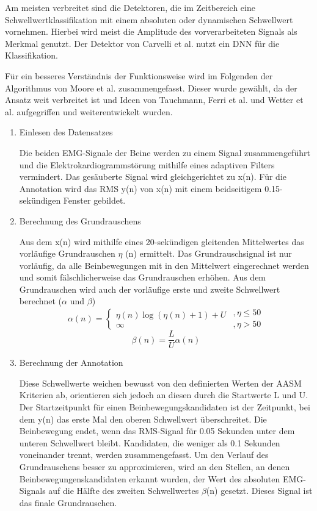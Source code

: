Am meisten verbreitet sind die Detektoren, die im Zeitbereich eine Schwellwertklassifikation mit einem absoluten \cite{wetter,ferri,Huang,stefani,tauchmann} oder dynamischen \cite{alvarez,Moore} Schwellwert vornehmen. Hierbei wird meist die Amplitude des vorverarbeiteten Signals als Merkmal genutzt. Der Detektor von Carvelli et al. nutzt ein \gls{DNN} für die Klassifikation.

Für ein besseres Verständnis der Funktionsweise wird im Folgenden der Algorithmus von Moore et al. zusammengefasst. Dieser wurde gewählt, da der Ansatz weit verbreitet ist und Ideen von Tauchmann, Ferri et al. und Wetter et al. aufgegriffen und weiterentwickelt wurden. 


\begin{enumerate}
	\item Einlesen des Datensatzes
	
	Die beiden EMG-Signale der Beine werden zu einem Signal zusammengeführt und die Elektrokardiogrammstörung mithilfe eines adaptiven Filters vermindert.
    Das gesäuberte Signal wird gleichgerichtet zu x(n).
    Für die Annotation wird das RMS y(n) von x(n) mit einem beidseitigem 0.15-sekündigen Fenster gebildet. 

	\item Berechnung des Grundrauschens
	
	Aus dem x(n) wird mithilfe eines 20-sekündigen gleitenden Mittelwertes das vorläufige Grundrauschen $\eta$ (n) ermittelt. Das Grundrauschsignal ist nur vorläufig, da alle Beinbewegungen mit in den Mittelwert eingerechnet werden und somit fälschlicherweise das Grundrauschen erhöhen. 
    Aus dem Grundrauschen wird auch der vorläufige erste und zweite Schwellwert berechnet ($\alpha$ und $\beta$)
    \[ \alpha(n) = \left\{\begin{matrix}\eta(n)\log(\eta(n)+1)+U \\\infty \end{matrix}
    \right.\begin{matrix}, \eta\leq 50\\, \eta> 50
    \end{matrix}\]
    \[ \beta(n) = \frac{L}{U} \alpha(n) \]


    \item Berechnung der Annotation
        
    Diese Schwellwerte weichen bewusst von den definierten Werten der AASM Kriterien ab, orientieren sich jedoch an diesen durch die Startwerte L und U. Der Startzeitpunkt für einen Beinbewegungskandidaten ist der Zeitpunkt, bei dem y(n) das erste Mal den oberen Schwellwert überschreitet. Die Beinbewegung endet, wenn das RMS-Signal für 0.05 Sekunden unter dem unteren Schwellwert bleibt. Kandidaten, die weniger als 0.1 Sekunden voneinander trennt, werden zusammengefasst. 
    Um den Verlauf des Grundrauschens besser zu approximieren, wird an den Stellen, an denen Beinbewegungenskandidaten erkannt wurden, der Wert des absoluten EMG-Signals auf die Hälfte des zweiten Schwellwertes $\beta$(n) gesetzt. Dieses Signal ist das finale Grundrauschen.
    
\end{enumerate}




